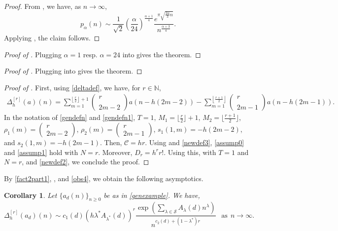\documentclass[11pt,reqno,a4paper]{amsart}
\renewcommand{\a}{\alpha}
\renewcommand{\l}{\lambda}
\renewcommand{\(}{\left\(}
\renewcommand{\)}{\right\)}
\newcommand{\pa}[2]{\left(\frac{#1}{#2}\right)}
\numberwithin{equation}{section}
\theoremstyle{plain}
\newtheorem{corollary}[theorem]{Corollary}
\theoremstyle{definition} %
\numberwithin{equation}{section}
\renewcommand{\binom}[2]{\left(\begin{smallmatrix}#1\\\\#2\end{smallmatrix}\right)}
\newcommand{\smallbinom}[2]{(\begin{smallmatrix}#1\\#2\end{smallmatrix})}
\begin{document}
\begin{proof}
	From \cite[Corollary 1.2]{IJT}, we have, as $n\to \infty$, 
	\[
	p_\a(n)\sim
	\frac{1}{\sqrt{2}}\pa{\a}{24}^{\frac{\a+1}{4}}\frac{e^{\pi\sqrt{\frac{2\a}3 n}}}{n^{\frac{\a+3}{4}}}.
	\]
 Applying , the claim follows.
\end{proof}






\begin{proof}[Proof of ]
 Plugging $\a=1$ resp. $\a=24$ into  gives the theorem.\qedhere 	
\end{proof}




\begin{proof}[Proof of ] 
 Plugging  into  gives the theorem. \qedhere 
\end{proof}





\begin{proof}[Proof of ]
First, using \eqref{deltadef}, we have, for $r\in \mathbb{N}$,
\begin{align*}
\Delta^{[r]}_h(a)(n)=\sum_{m=1}^{\left\lfloor\frac r2\right\rfloor+1}\binom{r}{2m-2}a\left(n-h(2m-2)\right)-\sum_{m=1}^{\left\lfloor\frac{r+1}{2}\right\rfloor}\binom{r}{2m-1}a\left(n-h(2m-1)\right).
\end{align*}	
 In the notation of \eqref{gendefn} and \eqref{gendefn1}, $T=1$, $M_1=\lfloor\frac{r}{2}\rfloor+1$, $M_2=\lfloor\frac{r+1}{2}\rfloor$, $\rho_1(m)=\smallbinom{r}{2m-2}$, $\rho_2(m)=\smallbinom{r}{2m-1}$, $s_1(1,m)=-h(2m-2)$, and $s_2(1,m)=-h(2m-1)$. Then, $\mathcal{C}=h r$. Using  and \eqref{newdef3}, \ref{assump0} and \ref{assump1} hold with $N=r$. Moreover, $D_r=h^rr!$. 
  Using this,  with $T=1$ and $N=r$, and \eqref{newdef2}, we conclude the proof.\qedhere  
\end{proof}


By  \ref{fact2part1}, , and \eqref{obs4}, we obtain the following asymptotics. 



\begin{corollary}\label{newsec4lem3}
 Let $\{a_d(n)\}_{n\ge 0}$ be as in \eqref{genexample}. We have, 
	\[
	\Delta^{[r]}_h(a_d)(n)\sim c_1(d)\left(h \l^*  A_{\l^*}(d)\right)^r \frac{\exp\left(\sum_{\l\in \mathcal{S}}  A_{\l}(d)n^{\l}\right) }{n^{c_2(d)+\left(1-\l^*\right)r}}\ \ \text{ as}\ \ n\to \infty.
	\]
\end{corollary}
\end{document}
